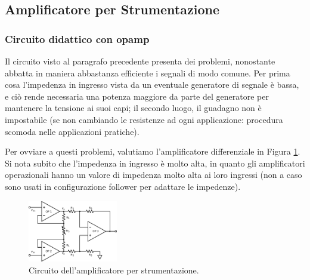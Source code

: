 \subsection{Amplificatore per Strumentazione}

\subsubsection*{Circuito didattico con opamp}



Il circuito visto al paragrafo precedente presenta dei problemi, nonostante abbatta in maniera abbastanza efficiente i segnali di modo comune. Per prima cosa l'impedenza in ingresso vista da un eventuale generatore di segnale è bassa, e ciò rende necessaria una potenza maggiore da parte del generatore per mantenere la tensione ai suoi capi; il secondo luogo, il guadagno non è impostabile (se non cambiando le resistenze ad ogni applicazione: procedura scomoda nelle applicazioni pratiche).

Per ovviare a questi problemi, valutiamo l'amplificatore differenziale in Figura \ref{cir5:instr_amplif}. Si nota subito che l'impedenza in ingresso è molto alta, in quanto gli amplificatori operazionali hanno un valore di impedenza molto alta ai loro ingressi (non a caso sono usati in configurazione follower per adattare le impedenze).

\begin{figure}
  \begin{center}
    \includegraphics[width=0.350\textwidth]{../E05/latex/c_INA.pdf}
  \end{center}
  \caption{Circuito dell'amplificatore per strumentazione.}
  \label{cir5:instr_amplif}
\end{figure}


